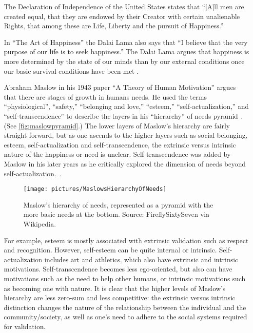 The Declaration of Independence of the United States states that ``[A]ll men are created equal, that they are endowed by their Creator with certain unalienable Rights, that among these are Life, Liberty and the pursuit of Happiness.''

In ``The Art of Happiness'' the Dalai Lama also says that ``I believe that the very purpose of our life is to seek happiness.'' The Dalai Lama argues that happiness is more determined by the state of our minds than by our external conditions once our basic survival conditions have been met \cite{lama2009art}.

Abraham Maslow in his 1943 paper ``A Theory of Human Motivation'' argues that there are stages of growth in humans needs. He used the terms ``physiological'', ``safety,'' ``belonging and love,'' ``esteem,'' ``self-actualization,'' and ``self-transcendence'' to describe the layers in his ``hierarchy'' of needs pyramid \cite{maslow_theory_1943}. (See \autoref{fig:maslowpyramid}.) The lower layers of Maslow's hierarchy are fairly straight forward, but as one ascends to the higher layers such as social belonging, esteem, self-actualization and self-transcendence, the extrinsic versus intrinsic nature of the happiness or need is unclear. Self-transcendence was added by Maslow in his later years as he critically explored the dimension of needs beyond self-actualization.\ \cite{maslow1991critique}.

\begin{figure}[t]
 \centering
 \texttt{[image: pictures/MaslowsHierarchyOfNeeds]}
 \caption[Maslow's hierarchy of needs]{Maslow's hierarchy of needs, represented as a pyramid with the more basic needs at the bottom. Source: FireflySixtySeven via Wikipedia. \ccbysa}
 \label{fig:maslowpyramid}
\end{figure}

For example, esteem is mostly associated with extrinsic validation such as respect and recognition. However, self-esteem can be quite internal or intrinsic. Self-actualization includes art and athletics, which also have extrinsic and intrinsic motivations. Self-transcendence becomes less ego-oriented, but also can have motivations such as the need to help other humans, or intrinsic motivations such as becoming one with nature. It is clear that the higher levels of Maslow's hierarchy are less zero-sum and less competitive: the extrinsic versus intrinsic distinction changes the nature of the relationship between the individual and the community/society, as well as one's need to adhere to the social systems required for validation.

